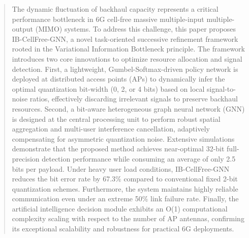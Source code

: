 \begin{abstract}
The dynamic fluctuation of backhaul capacity represents a critical performance bottleneck in 6G cell-free massive multiple-input multiple-output (MIMO) systems. To address this challenge, this paper proposes IB-CellFree-GNN, a novel task-oriented successive refinement framework rooted in the Variational Information Bottleneck principle. The framework introduces two core innovations to optimize resource allocation and signal detection. First, a lightweight, Gumbel-Softmax-driven policy network is deployed at distributed access points (APs) to dynamically infer the optimal quantization bit-width (0, 2, or 4 bits) based on local signal-to-noise ratios, effectively discarding irrelevant signals to preserve backhaul resources. Second, a bit-aware heterogeneous graph neural network (GNN) is designed at the central processing unit to perform robust spatial aggregation and multi-user interference cancellation, adaptively compensating for asymmetric quantization noise. Extensive simulations demonstrate that the proposed method achieves near-optimal 32-bit full-precision detection performance while consuming an average of only 2.5 bits per payload. Under heavy user load conditions, IB-CellFree-GNN reduces the bit error rate by 67.3\% compared to conventional fixed 2-bit quantization schemes. Furthermore, the system maintains highly reliable communication even under an extreme 50\% link failure rate. Finally, the artificial intelligence decision module exhibits an O(1) computational complexity scaling with respect to the number of AP antennas, confirming its exceptional scalability and robustness for practical 6G deployments.
\end{abstract}